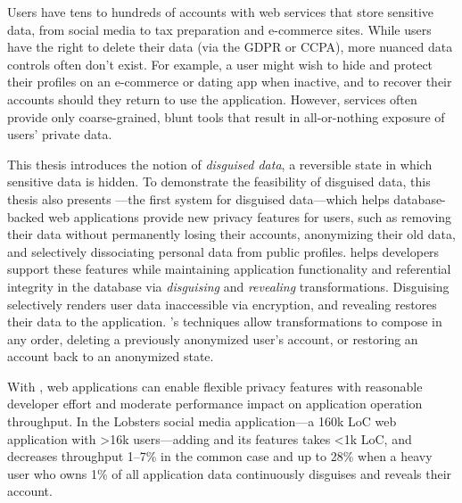 Users have tens to hundreds of accounts with web services that store
sensitive data, from social media to tax preparation and e-commerce
sites.
%
While users have the right to delete their data (via \eg the
GDPR or CCPA), more nuanced
data controls often don't exist.
%
For example, a user might wish to hide and protect their profiles on an
e-commerce or dating app when inactive, and to recover their accounts should
they return to use the application. 
%
However, services often provide only coarse-grained, blunt tools that
result in all-or-nothing exposure of users’ private data.
%

%
This thesis introduces the notion of \emph{disguised data}, a reversible state
in which sensitive data is hidden.
%
To demonstrate the feasibility of disguised data, this thesis also presents
\sys---the first system for disguised data---which helps database-backed web
applications provide new privacy features for users, such as 
removing their data without permanently losing their accounts, anonymizing their
old data, and selectively dissociating personal data from public profiles.
%
\sys helps developers support these features while maintaining application
functionality and referential integrity in the database via \emph{disguising} and
\emph{revealing} transformations.
%
Disguising selectively renders user data inaccessible via encryption, and
revealing restores their data to the application.
%
\sys's techniques allow transformations to compose in any order, \eg deleting a
previously anonymized user's account, or restoring an account back to an
anonymized state.
%

%
With \sys, web applications can enable flexible privacy features with reasonable
developer effort and moderate performance impact on application operation
throughput.
%
In the Lobsters social media application---a 160k LoC web application with >16k
users---adding \sys and its features takes <1k LoC, and decreases throughput
1--7\% in the common case and up to 28\% when a heavy user
who owns 1\% of all application data continuously disguises and reveals their
account.
%

%
